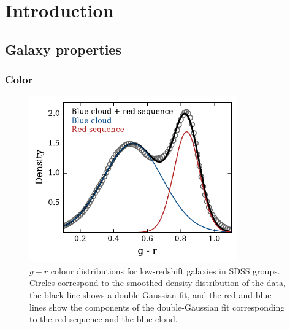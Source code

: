 \chapter{Introduction}
\label{chap:intro}

\section{Galaxy properties}
\label{sec:gal_properties}

\subsection{Color}
\label{sec:color}

\begin{figure}[!ht]
  \centering
  \includegraphics[width=0.8\textwidth]{gr_dist.pdf}
  \caption{$g-r$ colour distributions for low-redshift galaxies in
    SDSS groups.  Circles correspond to the smoothed density
    distribution of the data, the black line shows a double-Gaussian
    fit, and the red and blue lines show the components of the
    double-Gaussian fit corresponding to the red sequence and the blue
  cloud.}
  \label{fig:gr_dist}
\end{figure}


